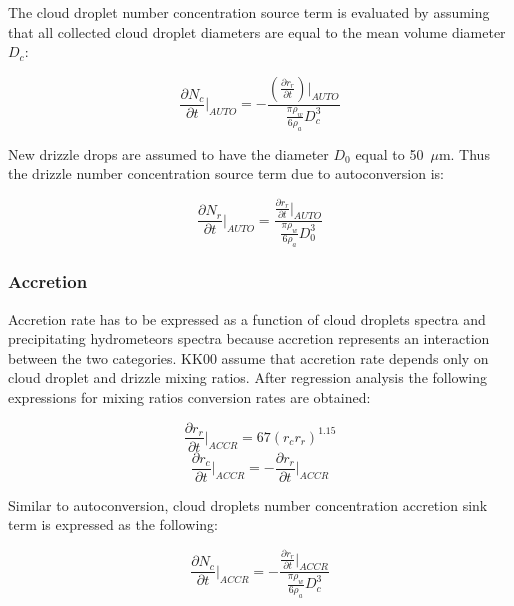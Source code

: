\noindent The cloud droplet number concentration source term is evaluated by assuming that all collected cloud droplet diameters are equal to the mean volume diameter $D_c$:

\begin{equation}
\frac{\displaystyle{\partial N_c}}{\displaystyle{\partial t}} \Big|_{AUTO}=-
\frac{(\frac{\displaystyle{\partial r_r}}{\displaystyle{\partial t}}) \Big|_{AUTO}}
{\frac{\pi\rho_w}{6\rho_a}D_c^3}
\end{equation}


\noindent New drizzle drops are assumed to have the diameter $D_0$ equal to 50~$\mu$m. Thus the drizzle number concentration source term due to autoconversion is:

\begin{equation}
\frac{\displaystyle{\partial N_r}}{\displaystyle{\partial t}} \Big|_{AUTO}=
\frac{\frac{\displaystyle{\partial r_r}}{\displaystyle{\partial t}} \Big|_{AUTO}}
{\frac{\pi\rho_w}{6\rho_a}D_0^{3}}
\end{equation}

\subsubsection{Accretion}

Accretion rate has to be expressed as a function of cloud droplets spectra and precipitating hydrometeors spectra because accretion represents an interaction between the two categories. KK00 assume that accretion rate depends only on cloud droplet and drizzle mixing ratios. After regression analysis the following expressions for mixing ratios conversion rates are obtained: 

\begin{equation}
\frac{\displaystyle{\partial r_r}}{\displaystyle{\partial t}} \Big|_{ACCR}=
67(r_{c}r_{r})^{1.15}
\end{equation}
\begin{equation}
\frac{\displaystyle{\partial r_c}}{\displaystyle{\partial t}} \Big|_{ACCR}=
-\frac{\displaystyle{\partial r_r}}{\displaystyle{\partial t}} \Big|_{ACCR}
\end{equation}

\noindent Similar to autoconversion, cloud droplets number concentration accretion sink term is expressed as the following: 

\begin{equation}
\frac{\displaystyle{\partial N_c}}{\displaystyle{\partial t}} \Big|_{ACCR}=-
\frac{\frac{\displaystyle{\partial r_r}}{\displaystyle{\partial t}} \Big|_{ACCR}}
{\frac{\pi\rho_w}{6\rho_a}D_c^3}
\end{equation}

